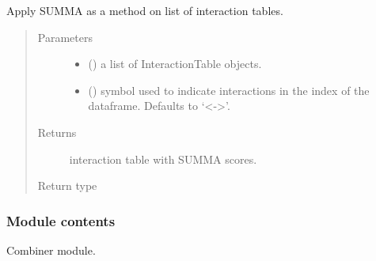 \documentclass[letterpaper,10pt,english]{sphinxmanual}
\begin{document}

\begin{fulllineitems}
\label{\detokenize{_modules/cosifer.combiners:cosifer.combiners.summa.summa_scores_table}}
Apply SUMMA as a method on list of interaction tables.
\begin{quote}\begin{description}
\item[{Parameters}] \leavevmode\begin{itemize}
\item {} 
 () \textendash{} a list of InteractionTable objects.

\item {} 
 (\sphinxstyleliteralemphasis{\sphinxupquote{, }}) \textendash{} symbol used to indicate
interactions in the index of the dataframe.
Defaults to ‘\textless{}-\textgreater{}’.

\end{itemize}

\item[{Returns}] \leavevmode
interaction table with SUMMA scores.

\item[{Return type}] \leavevmode
{\hyperref[\detokenize{_modules/cosifer.collections:cosifer.collections.interaction_table.InteractionTable}]{}}

\end{description}\end{quote}

\end{fulllineitems}



\subsubsection{Module contents}
\label{\detokenize{_modules/cosifer.combiners:module-cosifer.combiners}}\label{\detokenize{_modules/cosifer.combiners:module-contents}}
Combiner module.
\end{document}
